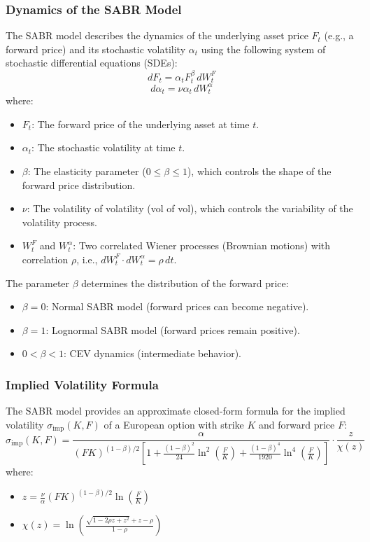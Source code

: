 \documentclass[11pt, oneside, a4paper, titlepage]{report}
\begin{document}
\subsubsection{Dynamics of the SABR Model}

The SABR model describes the dynamics of the underlying asset price \( F_t \) (e.g., a forward price) and its stochastic volatility \( \alpha_t \) using the following system of stochastic differential equations (SDEs):
\[
dF_t = \alpha_t F_t^\beta \, dW_t^F
\]
\[
d\alpha_t = \nu \alpha_t \, dW_t^\alpha
\]
where:
\begin{itemize}
    \item \( F_t \): The forward price of the underlying asset at time \( t \).
    \item \( \alpha_t \): The stochastic volatility at time \( t \).
    \item \( \beta \): The elasticity parameter (\( 0 \leq \beta \leq 1 \)), which controls the shape of the forward price distribution.
    \item \( \nu \): The volatility of volatility (vol of vol), which controls the variability of the volatility process.
    \item \( W_t^F \) and \( W_t^\alpha \): Two correlated Wiener processes (Brownian motions) with correlation \( \rho \), i.e., \( dW_t^F \cdot dW_t^\alpha = \rho \, dt \).
\end{itemize}

The parameter \( \beta \) determines the distribution of the forward price:
\begin{itemize}
    \item \( \beta = 0 \): Normal SABR model (forward prices can become negative).
    \item \( \beta = 1 \): Lognormal SABR model (forward prices remain positive).
    \item \( 0 < \beta < 1 \): CEV dynamics (intermediate behavior).
\end{itemize}

\subsubsection{Implied Volatility Formula}

The SABR model provides an approximate closed-form formula for the implied volatility \( \sigma_{\text{imp}}(K, F) \) of a European option with strike \( K \) and forward price \( F \):
\[
\sigma_{\text{imp}}(K, F) = \frac{\alpha}{(F K)^{(1-\beta)/2} \left[ 1 + \frac{(1-\beta)^2}{24} \ln^2\left(\frac{F}{K}\right) + \frac{(1-\beta)^4}{1920} \ln^4\left(\frac{F}{K}\right) \right]} \cdot \frac{z}{\chi(z)}
\]
where:
\begin{itemize}
    \item \( z = \frac{\nu}{\alpha} (F K)^{(1-\beta)/2} \ln\left(\frac{F}{K}\right) \)
    \item \( \chi(z) = \ln\left( \frac{\sqrt{1 - 2 \rho z + z^2} + z - \rho}{1 - \rho} \right) \)
\end{itemize}
\end{document}
